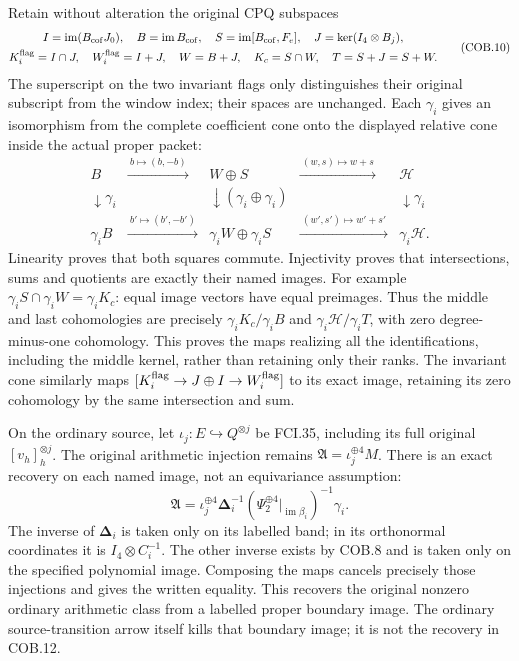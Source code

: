 Retain without alteration the original CPQ subspaces
\[
 \begin{gathered}
 I=\operatorname{im}(B_{\rm cof}J_0),\quad
 B=\operatorname{im}B_{\rm cof},\quad
 S=\operatorname{im}[B_{\rm cof},F_e],\quad
 J=\ker(I_4\otimes B_j),\\
 K_i^{\rm flag}=I\cap J,\quad W_i^{\rm flag}=I+J,\quad
 W=B+J,\quad K_c=S\cap W,\quad T=S+J=S+W.
 \end{gathered}\tag{COB.10}
\]
The superscript on the two invariant flags only distinguishes their
original subscript from the window index; their spaces are unchanged.
Each $\gamma_i$ gives an isomorphism from the complete coefficient cone
onto the displayed relative cone inside the actual proper packet:
\[
 \begin{array}{ccccc}
 B&\xrightarrow{\ b\mapsto(b,-b)\ }&W\oplus S
                 &\xrightarrow{\ (w,s)\mapsto w+s\ }&\mathcal H\\
 \downarrow\gamma_i&&\downarrow(\gamma_i\oplus\gamma_i)
                 &&\downarrow\gamma_i\\
 \gamma_iB&\xrightarrow{\ b'\mapsto(b',-b')\ }
     &\gamma_iW\oplus\gamma_iS
                 &\xrightarrow{\ (w',s')\mapsto w'+s'\ }&\gamma_i\mathcal H.
 \end{array}\tag{COB.11}
\]
Linearity proves that both squares commute.  Injectivity proves that
intersections, sums and quotients are exactly their named images.
For example $\gamma_iS\cap\gamma_iW=\gamma_iK_c$:
equal image vectors have equal preimages.  Thus the middle and last
cohomologies are precisely $\gamma_iK_c/\gamma_iB$ and
$\gamma_i\mathcal H/\gamma_iT$, with zero degree-minus-one
cohomology.  This proves the maps realizing all the identifications,
including the middle kernel, rather than retaining only their ranks.
The invariant cone similarly maps
$[K_i^{\rm flag}\to J\oplus I\to W_i^{\rm flag}]$ to its exact
image, retaining its zero cohomology by the same intersection and sum.

On the ordinary source, let $\iota_j:E\hookrightarrow Q^{\otimes j}$
be FCI.35, including its full original $[v_h]_h^{\otimes j}$.
The original arithmetic injection remains $\mathfrak A=\iota_j^{\oplus4}M$.
There is an exact recovery on each named image, not an equivariance
assumption:
\[
 \mathfrak A
   =\iota_j^{\oplus4}\boldsymbol\Delta_i^{-1}
          (\Psi_2^{\oplus4}|_{\operatorname{im}\beta_i})^{-1}\gamma_i.
 \tag{COB.12}
\]
The inverse of $\boldsymbol\Delta_i$ is taken only on its labelled
band; in its orthonormal coordinates it is $I_4\otimes C_i^{-1}$.
The other inverse exists by COB.8 and is taken only on the specified
polynomial image.  Composing the maps cancels precisely those
injections and gives the written equality.  This recovers the original
nonzero ordinary arithmetic class from a labelled proper boundary image.
The ordinary source-transition arrow itself kills that boundary image;
it is not the recovery in COB.12.

